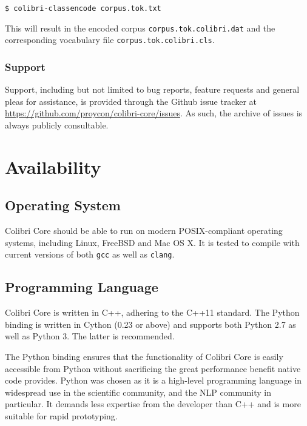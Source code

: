 \documentclass[a4paper,12pt]{article}
\begin{document}
\begin{verbatim}
$ colibri-classencode corpus.tok.txt 
\end{verbatim}

This will result in the encoded corpus \texttt{corpus.tok.colibri.dat} and the corresponding vocabulary file \texttt{corpus.tok.colibri.cls}.












\subsubsection{Support} 

Support, including but not limited to bug reports, feature requests and general
pleas for assistance, is provided through the Github issue tracker at
\url{https://github.com/proycon/colibri-core/issues}. As such, the archive of
issues is always publicly consultable. 

\section{Availability}

\subsection{Operating System}

Colibri Core should be able to run on modern POSIX-compliant operating systems, including
Linux, FreeBSD and Mac OS X. It is tested to compile with current versions of
both \texttt{gcc} as well as \texttt{clang}.

\subsection{Programming Language}

Colibri Core is written in C++, adhering to the C++11 standard. The Python
binding is written in Cython (0.23 or above) and supports both Python 2.7 as
well as Python 3. The latter is recommended.

The Python binding ensures that the functionality of Colibri Core is easily
accessible from Python without sacrificing the great performance benefit native
code provides. Python was chosen as it is a high-level programming language in
widespread use in the scientific community, and the NLP community in
particular. It demands less expertise from the developer than C++ and is more
suitable for rapid prototyping.
\end{document}
